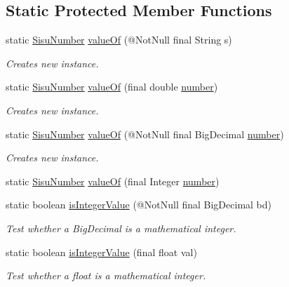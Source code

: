 \subsection*{Static Protected Member Functions}
\begin{DoxyCompactItemize}
\item 
static \hyperlink{classcom_1_1aarrelaakso_1_1drawl_1_1_sisu_number}{Sisu\+Number} \hyperlink{classcom_1_1aarrelaakso_1_1drawl_1_1_sisu_number_abf3f63611bbeb0505b3d6217ba140f9b}{value\+Of} (@Not\+Null final String s)
\begin{DoxyCompactList}\small\item\em Creates new instance. \end{DoxyCompactList}\item 
static \hyperlink{classcom_1_1aarrelaakso_1_1drawl_1_1_sisu_number}{Sisu\+Number} \hyperlink{classcom_1_1aarrelaakso_1_1drawl_1_1_sisu_number_ad51fc8c36a8e9d3dcca80dd633631904}{value\+Of} (final double \hyperlink{classcom_1_1aarrelaakso_1_1drawl_1_1_sisu_number_a5741c4131458787e3adb0bfe649d7758}{number})
\begin{DoxyCompactList}\small\item\em Creates new instance. \end{DoxyCompactList}\item 
static \hyperlink{classcom_1_1aarrelaakso_1_1drawl_1_1_sisu_number}{Sisu\+Number} \hyperlink{classcom_1_1aarrelaakso_1_1drawl_1_1_sisu_number_ad12beb94319a712de494e2710620031f}{value\+Of} (@Not\+Null final Big\+Decimal \hyperlink{classcom_1_1aarrelaakso_1_1drawl_1_1_sisu_number_a5741c4131458787e3adb0bfe649d7758}{number})
\begin{DoxyCompactList}\small\item\em Creates new instance. \end{DoxyCompactList}\item 
static \hyperlink{classcom_1_1aarrelaakso_1_1drawl_1_1_sisu_number}{Sisu\+Number} \hyperlink{classcom_1_1aarrelaakso_1_1drawl_1_1_sisu_number_aff49a9d0e8fa7aa03b45a15ee2365bb6}{value\+Of} (final Integer \hyperlink{classcom_1_1aarrelaakso_1_1drawl_1_1_sisu_number_a5741c4131458787e3adb0bfe649d7758}{number})
\item 
static boolean \hyperlink{classcom_1_1aarrelaakso_1_1drawl_1_1_sisu_number_a6fd0fcaee1f9723b48fbea1200f96414}{is\+Integer\+Value} (@Not\+Null final Big\+Decimal bd)
\begin{DoxyCompactList}\small\item\em Test whether a Big\+Decimal is a mathematical integer. \end{DoxyCompactList}\item 
static boolean \hyperlink{classcom_1_1aarrelaakso_1_1drawl_1_1_sisu_number_ab2ea066abe7a6f8f565ebfc7ac382b28}{is\+Integer\+Value} (final float val)
\begin{DoxyCompactList}\small\item\em Test whether a float is a mathematical integer. \end{DoxyCompactList}\end{DoxyCompactItemize}
